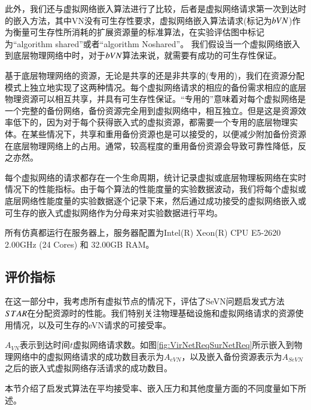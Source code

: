 此外，我们还与虚拟网络嵌入算法\cite{liu2011completing}进行了比较，后者是虚拟网络请求第一次到达时的嵌入方法，其中VN没有可生存性要求，虚拟网络嵌入算法请求(标记为$bVN$)作为衡量可生存性所消耗的扩展资源量的标准算法，在实验评估图中标记为“algorithm shared”或者“algorithm Noshared”。 我们假设当一个虚拟网络嵌入到底层物理网络中时，对于$bVN$算法来说，就需要有成功的可生存性保证。

基于底层物理网络的资源，无论是共享的还是非共享的(专用的)\cite{lu2006efficient}，我们在资源分配模式上独立地实现了这两种情况。每个虚拟网络请求的相应的备份需求相应的底层物理资源可以相互共享，并具有可生存性保证。“专用的”意味着对每个虚拟网络是一个完整的备份网络，备份资源完全用到虚拟网络中，相互独立。但是这是资源效率低下的，因为对于每个获得嵌入式的虚拟资源，都需要一个专用的底层物理实体。在某些情况下，共享和重用备份资源也是可以接受的，以便减少附加备份资源在底层物理网络上的占用。通常，较高程度的重用备份资源会导致可靠性降低，反之亦然。

每个虚拟网络的请求都存在一个生命周期，统计记录虚拟或底层物理板网络在实时情况下的性能指标。由于每个算法的性能度量的实验数据波动，我们将每个虚拟或底层网络性能度量的实验数据逐个记录下来，然后通过成功接受的虚拟网络嵌入或可生存的嵌入式虚拟网络作为分母来对实验数据进行平均。

所有仿真都运行在服务器上，服务器配置为Intel(R) Xeon(R) CPU E5-2620 2.00GHz (24 Cores) 和 32.00GB RAM。
\subsection{评价指标}
在这一部分中，我考虑所有虚拟节点的情况下，评估了SeVN问题启发式方法$STAR$在分配资源时的性能。我们特别关注物理基础设施和虚拟网络请求的资源使用情况，以及可生存的eVN请求的可接受率。

$A_{VN}$表示到达时间$t$虚拟网络请求数。如图\ref{fig:VirNetReqSurNetReq}所示嵌入到物理网络中的虚拟网络请求的成功数目表示为$A_{eVN}$，以及嵌入备份资源表示为$A_{SeVN}$之后的嵌入式虚拟网络存活请求的成功数目。

本节介绍了启发式算法在平均接受率、嵌入压力和其他度量方面的不同度量\cite{fischer2013virtual}如下所述。


